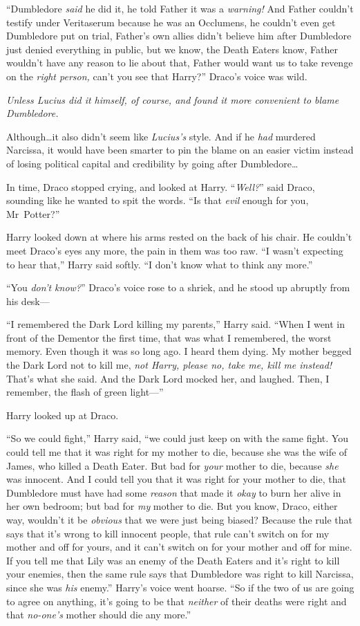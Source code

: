 “Dumbledore \emph{said} he did it, he told Father it was a \emph{warning!} And Father couldn’t testify under Veritaserum because he was an Occlumens, he couldn’t even get Dumbledore put on trial, Father’s own allies didn’t believe him after Dumbledore just denied everything in public, but we know, the Death Eaters know, Father wouldn’t have any reason to lie about that, Father would want us to take revenge on the \emph{right person,} can’t you see that Harry?” Draco’s voice was wild.

\emph{Unless Lucius did it himself, of course, and found it more convenient to blame Dumbledore.}

Although…it also didn’t seem like \emph{Lucius’s} style. And if he \emph{had} murdered Narcissa, it would have been smarter to pin the blame on an easier victim instead of losing political capital and credibility by going after Dumbledore…

In time, Draco stopped crying, and looked at Harry. “\emph{Well?}” said Draco, sounding like he wanted to spit the words. “Is that \emph{evil} enough for you, Mr~Potter?”

Harry looked down at where his arms rested on the back of his chair. He couldn’t meet Draco’s eyes any more, the pain in them was too raw. “I wasn’t expecting to hear that,” Harry said softly. “I don’t know what to think any more.”

“You \emph{don’t know?}” Draco’s voice rose to a shriek, and he stood up abruptly from his desk—

“I remembered the Dark Lord killing my parents,” Harry said. “When I went in front of the Dementor the first time, that was what I remembered, the worst memory. Even though it was so long ago. I heard them dying. My mother begged the Dark Lord not to kill me, \emph{not Harry, please no, take me, kill me instead!} That’s what she said. And the Dark Lord mocked her, and laughed. Then, I remember, the flash of green light—”

Harry looked up at Draco.

“So we could fight,” Harry said, “we could just keep on with the same fight. You could tell me that it was right for my mother to die, because she was the wife of James, who killed a Death Eater. But bad for \emph{your} mother to die, because \emph{she} was innocent. And I could tell you that it was right for your mother to die, that Dumbledore must have had some \emph{reason} that made it \emph{okay} to burn her alive in her own bedroom; but bad for \emph{my} mother to die. But you know, Draco, either way, wouldn’t it be \emph{obvious} that we were just being biased? Because the rule that says that it’s wrong to kill innocent people, that rule can’t switch on for my mother and off for yours, and it can’t switch on for your mother and off for mine. If you tell me that Lily was an enemy of the Death Eaters and it’s right to kill your enemies, then the same rule says that Dumbledore was right to kill Narcissa, since she was \emph{his} enemy.” Harry’s voice went hoarse. “So if the two of us are going to agree on anything, it’s going to be that \emph{neither} of their deaths were right and that \emph{no-one’s} mother should die any more.”


